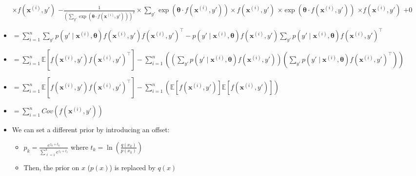 \begin{itemize}
    $\times f(\boldsymbol{x}^{(i)}, y')$
    $- \frac{1}{(\sum_{y'} \exp(\boldsymbol{\theta} \cdot f(\boldsymbol{x}^{(i)}, y')))^2} \times \sum_{y'} \exp(\boldsymbol{\theta} \cdot f(\boldsymbol{x}^{(i)}, y')) \times f(\boldsymbol{x}^{(i)}, y')$
    $\times \exp(\boldsymbol{\theta} \cdot f(\boldsymbol{x}^{(i)}, y'))$
    $\times f(\boldsymbol{x}^{(i)}, y')$
    $+0$
    \item $ = \sum_{i=1}^n \sum_{y'} p(y' \mid \boldsymbol{x}^{(i)}, \boldsymbol{\theta}) f(\boldsymbol{x}^{(i)}, y') f(\boldsymbol{x}^{(i)}, y')^\intercal - p(y' \mid \boldsymbol{x}^{(i)}, \boldsymbol{\theta}) f(\boldsymbol{x}^{(i)}, y') \sum_{y'} p(y' \mid \boldsymbol{x}^{(i)}, \boldsymbol{\theta}) f(\boldsymbol{x}^{(i)}, y')^\intercal$
    \item $ = \sum_{i=1}^n \mathbb{E}[f(\boldsymbol{x}^{(i)}, y') f(\boldsymbol{x}^{(i)}, y')^\intercal] - \sum_{i=1}^n( (\sum_{y'} p(y' \mid \boldsymbol{x}^{(i)}, \boldsymbol{\theta}) f(\boldsymbol{x}^{(i)}, y')) (\sum_{y'} p(y' \mid \boldsymbol{x}^{(i)}, \boldsymbol{\theta}) f(\boldsymbol{x}^{(i)}, y')^\intercal) )$
    \item $ = \sum_{i=1}^n \mathbb{E}[f(\boldsymbol{x}^{(i)}, y') f(\boldsymbol{x}^{(i)}, y')^\intercal] - \sum_{i=1}^n( \mathbb{E}[f(\boldsymbol{x}^{(i)}, y')] \mathbb{E}[f(\boldsymbol{x}^{(i)}, y')] )$
    \item $= \sum_{i=1}^n Cov(f(\boldsymbol{x}^{(i)}, y'))$
    \item We can set a different prior by introducing an offset:
    \begin{itemize}
        \item $
        p_k = \frac{e^{z_k + t_k}}{\sum_{\ell=1}^k e^{z_\ell + t_\ell}}
        $ where $t_k = \ln(\frac{q(x_k)}{p(x_k)})$
        \item Then, the prior on $x$ ($p(x)$) is replaced by $q(x)$
    \end{itemize}
\end{itemize}